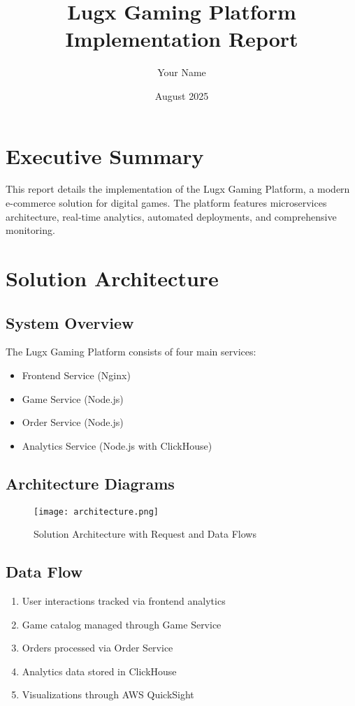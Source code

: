 \documentclass[12pt]{report}
\title{Lugx Gaming Platform Implementation Report}
\author{Your Name}
\date{August 2025}
\begin{document}
\maketitle
\tableofcontents

\chapter{Executive Summary}
This report details the implementation of the Lugx Gaming Platform, a modern e-commerce solution for digital games. The platform features microservices architecture, real-time analytics, automated deployments, and comprehensive monitoring.

\chapter{Solution Architecture}
\section{System Overview}
The Lugx Gaming Platform consists of four main services:
\begin{itemize}
    \item Frontend Service (Nginx)
    \item Game Service (Node.js)
    \item Order Service (Node.js)
    \item Analytics Service (Node.js with ClickHouse)
\end{itemize}

\section{Architecture Diagrams}
\begin{figure}[h]
    \centering
    \texttt{[image: architecture.png]}
    \caption{Solution Architecture with Request and Data Flows}
\end{figure}

\section{Data Flow}
\begin{enumerate}
    \item User interactions tracked via frontend analytics
    \item Game catalog managed through Game Service
    \item Orders processed via Order Service
    \item Analytics data stored in ClickHouse
    \item Visualizations through AWS QuickSight
\end{enumerate}
\end{document}
